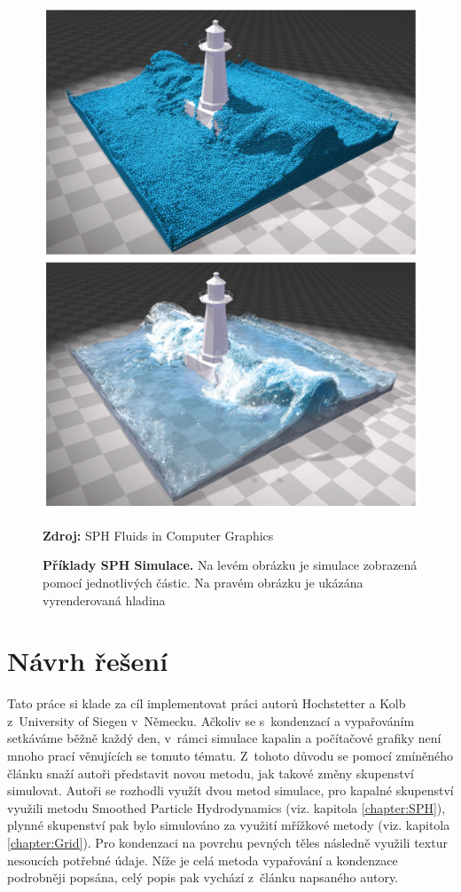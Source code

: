 \begin{figure}[h]\centering
  \centering
  \captionsetup{justification=centering}
	\includegraphics[width=0.5\linewidth]{obrazky-figures/SPHSim1_01.jpg}\hfill
	\includegraphics[width=0.5\linewidth]{obrazky-figures/SPHSim1_02.jpg}\hfill
  \caption{\textbf{Příklady SPH Simulace.} Na levém obrázku je simulace zobrazená pomocí jednotlivých částic. Na pravém obrázku je ukázána vyrenderovaná hladina}
  \textbf{Zdroj: } SPH Fluids in Computer Graphics \cite{Ihmsen14}
  \label{fig:SPHFigure}
\end{figure}

\chapter{Návrh řešení}
\label{chapter:navrh_resení}
Tato práce si klade za cíl implementovat práci \cite{Evap&Cond} autorů Hochstetter a Kolb z~University of Siegen v~Německu. Ačkoliv se s~kondenzací a vypařováním setkáváme běžně každý den, v~rámci simulace kapalin a počítačové grafiky není mnoho prací věnujících se tomuto tématu. Z~tohoto důvodu se pomocí zmíněného článku snaží autoři představit novou metodu, jak takové změny skupenství simulovat. Autoři se rozhodli využít dvou metod simulace, pro kapalné skupenství využili metodu Smoothed Particle Hydrodynamics (viz. kapitola \ref{chapter:SPH}), plynné skupenství pak bylo simulováno za využití mřížkové metody (viz. kapitola \ref{chapter:Grid}). Pro kondenzaci na povrchu pevných těles následně využili textur nesoucích potřebné údaje. Níže je celá metoda vypařování a kondenzace podrobněji popsána, celý popis pak vychází z~článku napsaného autory. \cite{Evap&Cond}


